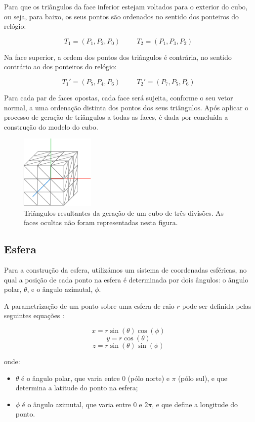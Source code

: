 \documentclass[12pt, a4paper]{article}
\begin{document}
Para que os triângulos da face inferior estejam voltados para o exterior do cubo, ou seja, para
baixo, os seus pontos são ordenados no sentido dos ponteiros do relógio:

$$
T_1 = (P_1, P_2, P_0)
\hspace{1cm}
T_2 = (P_1, P_3, P_2)
$$

Na face superior, a ordem dos pontos dos triângulos é contrária, no sentido contrário ao dos
ponteiros do relógio:

$$
T_1' = (P_5, P_4, P_6)
\hspace{1cm}
T_2' = (P_7, P_5, P_6)
$$

Para cada par de faces opostas, cada face será sujeita, conforme o seu vetor normal, a uma ordenação
distinta dos pontos dos seus triângulos. Após aplicar o processo de geração de triângulos a todas as
faces, é dada por concluída a construção do modelo do cubo.

\begin{figure}[H]
    \centering
    \includegraphics[width=0.32\textwidth]{res/phase1/figures/CubeTriangles.pdf}
    \caption{
        \onehalfspacing
        Triângulos resultantes da geração de um cubo de três divisões. As faces ocultas não foram
        representadas nesta figura.
    }
\end{figure}

\subsection{Esfera}

Para a construção da esfera, utilizámos um sistema de coordenadas esféricas, no qual a posição de
cada ponto na esfera é determinada por dois ângulos: o ângulo polar, $\theta$, e o ângulo azimutal,
$\phi$.

A parametrização de um ponto sobre uma esfera de raio \( r \) pode ser definida pelas seguintes
equações \cite{sphere}:

$$x = r \sin(\theta) \cos(\phi)$$
$$y = r \cos(\theta)$$
$$z = r \sin(\theta) \sin(\phi)$$

onde:
\begin{itemize}
    \item $\theta$ é o ângulo polar, que varia entre $0$ (pólo norte) e $\pi$ (pólo sul), e que
        determina a latitude do ponto na esfera;
    \item $\phi$ é o ângulo azimutal, que varia entre $0$ e $2\pi$, e que define a longitude do
        ponto.
\end{itemize}
\end{document}
